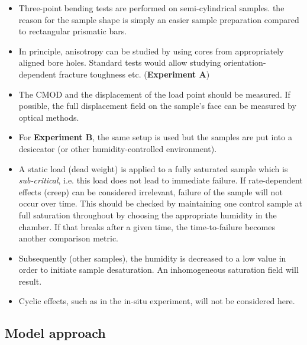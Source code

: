 \begin{itemize}
	\item Three-point bending tests are performed on semi-cylindrical samples. the reason for the sample shape is simply an easier sample preparation compared to rectangular prismatic bars.
	\item In principle, anisotropy can be studied by using cores from appropriately aligned bore holes. Standard tests would allow studying orientation-dependent fracture toughness etc. (\textbf{Experiment A})
	\item The CMOD and the displacement of the load point should be measured. If possible, the full displacement field on the sample's face can be measured by optical methods.
	\item For \textbf{Experiment B}, the same setup is used but the samples are put into a desiccator (or other humidity-controlled environment).
	\item A static load (dead weight) is applied to a fully saturated sample which is \textit{sub-critical}, i.e. this load does not lead to immediate failure. If rate-dependent effects (creep) can be considered irrelevant, failure of the sample will not occur over time. This should be checked by maintaining one control sample at full saturation throughout by choosing the appropriate humidity in the chamber. If that breaks after a given time, the time-to-failure becomes another comparison metric.
	\item Subsequently (other samples), the humidity is decreased to a low value in order to initiate sample desaturation. An inhomogeneous saturation field will result.
	\item Cyclic effects, such as in the in-situ experiment, will not be considered here.
\end{itemize} 

\subsection{Model approach}

